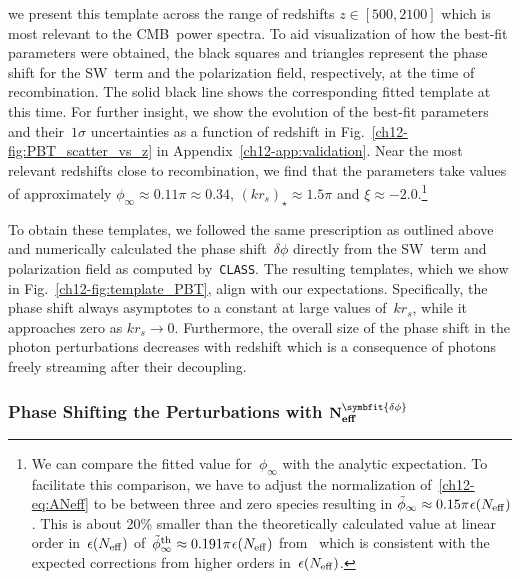 we present this template across the range of redshifts $z \in [500, 2100]$ which is most relevant to the CMB~power spectra. To aid visualization of how the best-fit parameters were obtained, the black squares and triangles represent the phase shift for the SW~term and the polarization field, respectively, at the time of recombination. The solid black line shows the corresponding fitted template at this time. For further insight, we show the evolution of the best-fit parameters and their~$1\sigma$ uncertainties as a function of redshift in Fig.~\ref{ch12-fig:PBT_scatter_vs_z} in Appendix~\ref{ch12-app:validation}. Near the most relevant redshifts close to recombination, we find that the parameters take values of approximately $\phi_\infty \approx 0.11\pi \approx 0.34$, $(k r_s)_\star \approx 1.5\pi$ and $\xi \approx -2.0$.\footnote{We can compare the fitted value for~$\phi_\infty$ with the analytic expectation. To facilitate this comparison, we have to adjust the normalization of~\eqref{ch12-eq:ANeff} to be between three and zero species resulting in $\tilde{\phi}_\infty \approx 0.15\pi\hskip0.5pt\epsilon(N_\mathrm{eff})$. This is about 20\% smaller than the theoretically calculated value at linear order in~$\epsilon(N_\mathrm{eff})$ of~$\tilde{\phi}_\infty^\mathrm{th} \approx 0.191\pi\hskip0.5pt\epsilon(N_\mathrm{eff})$ from~\cite{Bashinsky:2003tk, Baumann:2015rya} which is consistent with the expected corrections from higher orders in~$\epsilon(N_\mathrm{eff})$.}

To obtain these templates, we followed the same prescription as outlined above and numerically calculated the phase shift~$\delta\phi$ directly from the SW~term and polarization field as computed by~\texttt{CLASS}. The resulting templates, which we show in Fig.~\ref{ch12-fig:template_PBT}, align with our expectations. Specifically, the phase shift always asymptotes to a constant at large values of~$k r_s$, while it approaches zero as $k r_s \to 0$. Furthermore, the overall size of the phase shift in the photon perturbations decreases with redshift which is a consequence of photons freely streaming after their decoupling.


\subsubsection[Phase Shifting the Perturbations with Neff]{Phase Shifting the Perturbations with $\mathbf{N}_\mathbf{eff}^{\symbfit{\delta\phi}}$}
\label{ch12-sec:sources_to_Cells}

